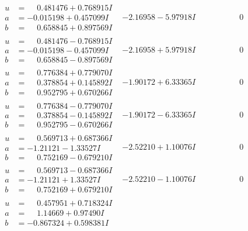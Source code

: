 \documentclass[1p]{elsarticle_modified}
\theoremstyle{definition}
\begin{document}
$$\begin{array}{c|c|c}
\begin{aligned}
u &= \phantom{-}0.481476 + 0.768915 I \\
a &= -0.015198 + 0.457099 I \\
b &= \phantom{-}0.658845 + 0.897569 I\end{aligned}
 & -2.16958 - 5.97918 I & \phantom{-0.000000 } 0 \\ \hline\begin{aligned}
u &= \phantom{-}0.481476 - 0.768915 I \\
a &= -0.015198 - 0.457099 I \\
b &= \phantom{-}0.658845 - 0.897569 I\end{aligned}
 & -2.16958 + 5.97918 I & \phantom{-0.000000 } 0 \\ \hline\begin{aligned}
u &= \phantom{-}0.776384 + 0.779070 I \\
a &= \phantom{-}0.378854 + 0.145892 I \\
b &= \phantom{-}0.952795 + 0.670266 I\end{aligned}
 & -1.90172 + 6.33365 I & \phantom{-0.000000 } 0 \\ \hline\begin{aligned}
u &= \phantom{-}0.776384 - 0.779070 I \\
a &= \phantom{-}0.378854 - 0.145892 I \\
b &= \phantom{-}0.952795 - 0.670266 I\end{aligned}
 & -1.90172 - 6.33365 I & \phantom{-0.000000 } 0 \\ \hline\begin{aligned}
u &= \phantom{-}0.569713 + 0.687366 I \\
a &= -1.21121 - 1.33527 I \\
b &= \phantom{-}0.752169 - 0.679210 I\end{aligned}
 & -2.52210 + 1.10076 I & \phantom{-0.000000 } 0 \\ \hline\begin{aligned}
u &= \phantom{-}0.569713 - 0.687366 I \\
a &= -1.21121 + 1.33527 I \\
b &= \phantom{-}0.752169 + 0.679210 I\end{aligned}
 & -2.52210 - 1.10076 I & \phantom{-0.000000 } 0 \\ \hline\begin{aligned}
u &= \phantom{-}0.457951 + 0.718324 I \\
a &= \phantom{-}1.14669 + 0.97490 I \\
b &= -0.867324 + 0.598381 I\end{aligned}

\end{array}$$
\end{document}
